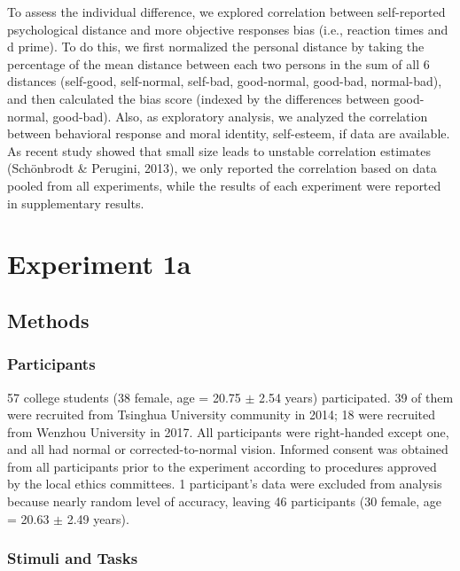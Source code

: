 \documentclass[man]{apa6}
\begin{document}
To assess the individual difference, we explored correlation between self-reported psychological distance and more objective responses bias (i.e., reaction times and d prime). To do this, we first normalized the personal distance by taking the percentage of the mean distance between each two persons in the sum of all 6 distances (self-good, self-normal, self-bad, good-normal, good-bad, normal-bad), and then calculated the bias score (indexed by the differences between good-normal, good-bad). Also, as exploratory analysis, we analyzed the correlation between behavioral response and moral identity, self-esteem, if data are available. As recent study showed that small size leads to unstable correlation estimates (Schönbrodt \& Perugini, 2013), we only reported the correlation based on data pooled from all experiments, while the results of each experiment were reported in supplementary results.

\hypertarget{experiment-1a}{%
\section{Experiment 1a}\label{experiment-1a}}

\hypertarget{methods}{%
\subsection{Methods}\label{methods}}

\hypertarget{participants}{%
\subsubsection{Participants}\label{participants}}

57 college students (38 female, age = 20.75 \(\pm\) 2.54 years) participated. 39 of them were recruited from Tsinghua University community in 2014; 18 were recruited from Wenzhou University in 2017. All participants were right-handed except one, and all had normal or corrected-to-normal vision. Informed consent was obtained from all participants prior to the experiment according to procedures approved by the local ethics committees. 1 participant's data were excluded from analysis because nearly random level of accuracy, leaving 46 participants (30 female, age = 20.63 \(\pm\) 2.49 years).

\hypertarget{stimuli-and-tasks}{%
\subsubsection{Stimuli and Tasks}\label{stimuli-and-tasks}}
\end{document}
